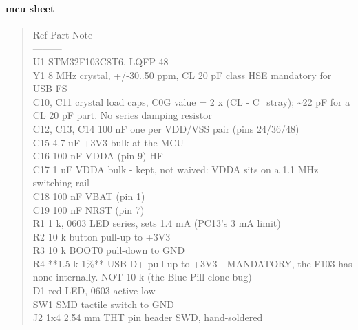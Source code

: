 \documentclass[11pt,a4paper]{article}
\begin{document}
\paragraph*{mcu sheet}
\begin{quote}\small\ttfamily\raggedright
\textbar{} Ref \textbar{} Part \textbar{} Note \textbar{}\\
\textbar{}---\textbar{}---\textbar{}---\textbar{}\\
\textbar{} U1 \textbar{} STM32F103C8T6, LQFP-48 \textbar{} \textbar{}\\
\textbar{} Y1 \textbar{} 8 MHz crystal, +/-30..50 ppm, CL 20 pF class \textbar{} HSE mandatory for USB FS \textbar{}\\
\textbar{} C10, C11 \textbar{} crystal load caps, C0G \textbar{} value = 2 x (CL - C\_stray); \textasciitilde{}22 pF for a CL 20 pF part. No series damping resistor \textbar{}\\
\textbar{} C12, C13, C14 \textbar{} 100 nF \textbar{} one per VDD/VSS pair (pins 24/36/48) \textbar{}\\
\textbar{} C15 \textbar{} 4.7 uF \textbar{} +3V3 bulk at the MCU \textbar{}\\
\textbar{} C16 \textbar{} 100 nF \textbar{} VDDA (pin 9) HF \textbar{}\\
\textbar{} C17 \textbar{} 1 uF \textbar{} VDDA bulk - kept, not waived: VDDA sits on a 1.1 MHz switching rail \textbar{}\\
\textbar{} C18 \textbar{} 100 nF \textbar{} VBAT (pin 1) \textbar{}\\
\textbar{} C19 \textbar{} 100 nF \textbar{} NRST (pin 7) \textbar{}\\
\textbar{} R1 \textbar{} 1 k, 0603 \textbar{} LED series, sets 1.4 mA (PC13's 3 mA limit) \textbar{}\\
\textbar{} R2 \textbar{} 10 k \textbar{} button pull-up to +3V3 \textbar{}\\
\textbar{} R3 \textbar{} 10 k \textbar{} BOOT0 pull-down to GND \textbar{}\\
\textbar{} R4 \textbar{} {*}{*}1.5 k 1\%{*}{*} \textbar{} USB D+ pull-up to +3V3 - MANDATORY, the F103 has none internally. NOT 10 k (the Blue Pill clone bug) \textbar{}\\
\textbar{} D1 \textbar{} red LED, 0603 \textbar{} active low \textbar{}\\
\textbar{} SW1 \textbar{} SMD tactile switch \textbar{} to GND \textbar{}\\
\textbar{} J2 \textbar{} 1x4 2.54 mm THT pin header \textbar{} SWD, hand-soldered \textbar{}
\end{quote}
\end{document}
